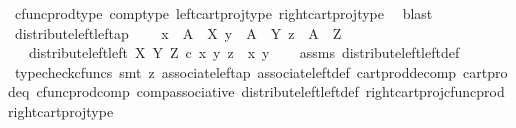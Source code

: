 \begin{isabellebody}
\ cfunc{\isacharunderscore}{\kern0pt}prod{\isacharunderscore}{\kern0pt}type\ comp{\isacharunderscore}{\kern0pt}type\ left{\isacharunderscore}{\kern0pt}cart{\isacharunderscore}{\kern0pt}proj{\isacharunderscore}{\kern0pt}type\ right{\isacharunderscore}{\kern0pt}cart{\isacharunderscore}{\kern0pt}proj{\isacharunderscore}{\kern0pt}type\ \isamarkupfalse%
\ blast%
\endisatagproof
{\isafoldproof}%
%
\isadelimproof
\isanewline
%
\endisadelimproof
\isanewline
{}\isamarkupfalse%
\ distribute{\isacharunderscore}{\kern0pt}left{\isacharunderscore}{\kern0pt}left{\isacharunderscore}{\kern0pt}ap{\isacharcolon}{\kern0pt}\ \isanewline
\ \ \ {\isachardoublequoteopen}x\ {\isacharcolon}{\kern0pt}\ A\ {\isasymrightarrow}\ X{\isachardoublequoteclose}\ {\isachardoublequoteopen}y\ {\isacharcolon}{\kern0pt}\ A\ {\isasymrightarrow}\ Y{\isachardoublequoteclose}\ {\isachardoublequoteopen}z\ {\isacharcolon}{\kern0pt}\ A\ {\isasymrightarrow}\ Z{\isachardoublequoteclose}\isanewline
\ \ \ {\isachardoublequoteopen}distribute{\isacharunderscore}{\kern0pt}left{\isacharunderscore}{\kern0pt}left\ X\ Y\ Z\ {\isasymcirc}\isactrlsub c\ {\isasymlangle}x{\isacharcomma}{\kern0pt}\ {\isasymlangle}y{\isacharcomma}{\kern0pt}\ z{\isasymrangle}{\isasymrangle}\ {\isacharequal}{\kern0pt}\ {\isasymlangle}x{\isacharcomma}{\kern0pt}\ y{\isasymrangle}{\isachardoublequoteclose}\isanewline
%
\isadelimproof
\ \ %
\endisadelimproof
%
\isatagproof
{}\isamarkupfalse%
\ assms\ distribute{\isacharunderscore}{\kern0pt}left{\isacharunderscore}{\kern0pt}left{\isacharunderscore}{\kern0pt}def\ \ \isanewline
\ \ \isamarkupfalse%
\ {\isacharparenleft}{\kern0pt}typecheck{\isacharunderscore}{\kern0pt}cfuncs{\isacharcomma}{\kern0pt}\ smt\ {\isacharparenleft}{\kern0pt}z{}{\isacharparenright}{\kern0pt}\ associate{\isacharunderscore}{\kern0pt}left{\isacharunderscore}{\kern0pt}ap\ associate{\isacharunderscore}{\kern0pt}left{\isacharunderscore}{\kern0pt}def\ cart{\isacharunderscore}{\kern0pt}prod{\isacharunderscore}{\kern0pt}decomp\ cart{\isacharunderscore}{\kern0pt}prod{\isacharunderscore}{\kern0pt}eq{}\ cfunc{\isacharunderscore}{\kern0pt}prod{\isacharunderscore}{\kern0pt}comp\ comp{\isacharunderscore}{\kern0pt}associative{}\ distribute{\isacharunderscore}{\kern0pt}left{\isacharunderscore}{\kern0pt}left{\isacharunderscore}{\kern0pt}def\ right{\isacharunderscore}{\kern0pt}cart{\isacharunderscore}{\kern0pt}proj{\isacharunderscore}{\kern0pt}cfunc{\isacharunderscore}{\kern0pt}prod\ right{\isacharunderscore}{\kern0pt}cart{\isacharunderscore}{\kern0pt}proj{\isacharunderscore}{\kern0pt}type{\isacharparenright}{\kern0pt}%

\end{isabellebody}
